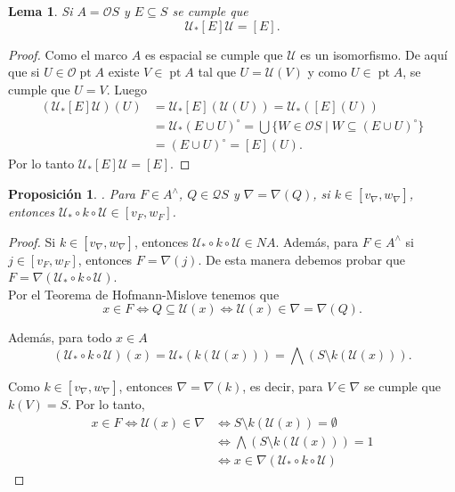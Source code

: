 \documentclass[11pt]{amsart}
\DeclareMathOperator{\pt}{pt}
\theoremstyle{plain}
\newtheorem{lem}[thm]{Lema}
\newtheorem{prop}[thm]{Proposición}
\theoremstyle{definition}
\begin{document}
\begin{lem}\label{lem:auxiliar}
Si $A=\mathcal{O}S$ y $E\subseteq S$ se cumple que
\[
\mathcal{U}_*[E]\mathcal{U}=[E].
\]
\end{lem}

\begin{proof}
Como el marco $A$ es espacial se cumple que $\mathcal{U}$ es un isomorfismo. De aquí que si $U\in \mathcal{O}\pt A$ existe $V\in \pt A$ tal que $U=\mathcal{U}(V)$ y como $U\in \pt A$, se cumple que $U=V$. Luego
\[
\begin{split}
(\mathcal{U}_*[E]\mathcal{U})(U)&=\mathcal{U}_*[E](\mathcal{U}(U))=\mathcal{U}_*([E](U))\\
&=\mathcal{U}_*(E\cup U)^{\circ}=\bigcup\{W\in \mathcal{O}S\mid W\subseteq (E\cup U)^{\circ}\}\\
&=(E\cup U)^{\circ}=[E](U).
\end{split}
\]
Por lo tanto $\mathcal{U}_*[E]\mathcal{U}=[E]$.
\end{proof}

\begin{prop}\label{morfismo} .
    Para $F\in A^\wedge$, $Q\in\mathcal{Q}S$ y $\nabla=\nabla(Q)$, si $k\in [v_\nabla, w_\nabla]$, entonces $\mathcal{U}_*\circ k\circ\mathcal{U}\in [v_F, w_F]$.
\end{prop}

\begin{proof}
Si $k\in [v_\nabla, w_\nabla]$, entonces $\mathcal{U}_*\circ k\circ \mathcal{U}\in NA$. Además, para $F\in A^\wedge$ si $j\in [v_F, w_F]$, entonces $F=\nabla(j)$. De esta manera debemos probar que $F=\nabla(\mathcal{U}_*\circ k\circ \mathcal{U})$.\\

Por el Teorema de Hofmann-Mislove tenemos que
\[
x\in F\iff Q\subseteq \mathcal{U}(x)\iff \mathcal{U}(x)\in \nabla=\nabla(Q).
\]

Además, para todo $x\in A$
\[
(\mathcal{U}_*\circ k\circ\mathcal{U})(x)=\mathcal{U}_*(k(\mathcal{U}(x)))=\bigwedge(S\setminus k(\mathcal{U}(x))).
\]

Como $k\in [v_\nabla, w_\nabla]$, entonces $\nabla=\nabla(k)$, es decir, para $V\in \nabla$ se cumple que $k(V)=S$. Por lo tanto,
\[
\begin{split}
x\in F\iff \mathcal{U}(x)\in \nabla &\iff S\setminus k(\mathcal{U}(x))=\emptyset\\
&\iff \bigwedge(S\setminus k(\mathcal{U}(x)))=1\\
&\iff x\in \nabla(\mathcal{U}_*\circ k\circ \mathcal{U})
\end{split}
\]
\end{proof}
\end{document}
